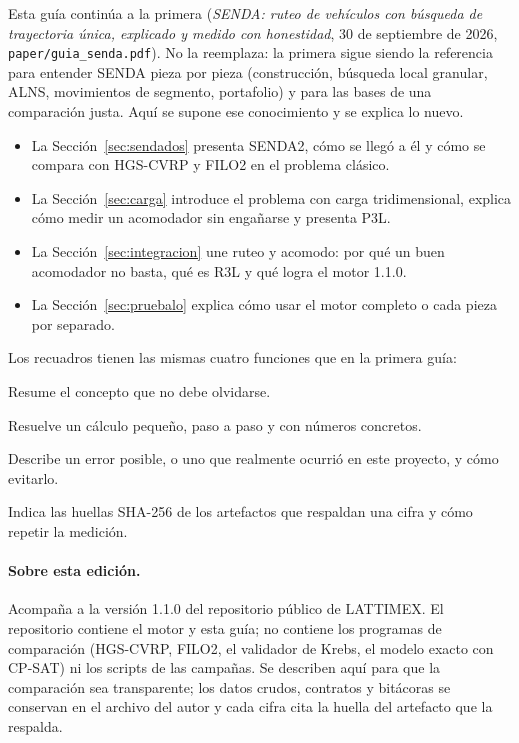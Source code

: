 \documentclass[11pt,a4paper]{article}
\newcommand{\senda}{SENDA}
\newcommand{\sendados}{SENDA2}
\newcommand{\tsl}[1]{\texttt{\small #1}}
\begin{document}
Esta guía continúa a la primera (\emph{SENDA: ruteo de vehículos con búsqueda de trayectoria única,
explicado y medido con honestidad}, 30 de septiembre de 2026, \tsl{paper/guia\_senda.pdf}). No la
reemplaza: la primera sigue siendo la referencia para entender \senda{} pieza por pieza (construcción,
búsqueda local granular, ALNS, movimientos de segmento, portafolio) y para las bases de una
comparación justa. Aquí se supone ese conocimiento y se explica lo nuevo.

\begin{itemize}[leftmargin=1.5em]
\item La Sección~\ref{sec:sendados} presenta \sendados{}, cómo se llegó a él y cómo se compara con
HGS-CVRP y FILO2 en el problema clásico.
\item La Sección~\ref{sec:carga} introduce el problema con carga tridimensional, explica cómo medir
un acomodador sin engañarse y presenta P3L.
\item La Sección~\ref{sec:integracion} une ruteo y acomodo: por qué un buen acomodador no basta, qué
es R3L y qué logra el motor 1.1.0.
\item La Sección~\ref{sec:pruebalo} explica cómo usar el motor completo o cada pieza por separado.
\end{itemize}

Los recuadros tienen las mismas cuatro funciones que en la primera guía:

\begin{ideaclave}
Resume el concepto que no debe olvidarse.
\end{ideaclave}
\begin{ejemplo}
Resuelve un cálculo pequeño, paso a paso y con números concretos.
\end{ejemplo}
\begin{leccion}
Describe un error posible, o uno que realmente ocurrió en este proyecto, y cómo evitarlo.
\end{leccion}
\begin{reproducir}
Indica las huellas SHA-256 de los artefactos que respaldan una cifra y cómo repetir la medición.
\end{reproducir}

\paragraph{Sobre esta edición.} Acompaña a la versión 1.1.0 del repositorio público de LATTIMEX. El
repositorio contiene el motor y esta guía; no contiene los programas de comparación (HGS-CVRP, FILO2,
el validador de Krebs, el modelo exacto con CP-SAT) ni los scripts de las campañas. Se describen aquí
para que la comparación sea transparente; los datos crudos, contratos y bitácoras se conservan en el
archivo del autor y cada cifra cita la huella del artefacto que la respalda.
\end{document}
